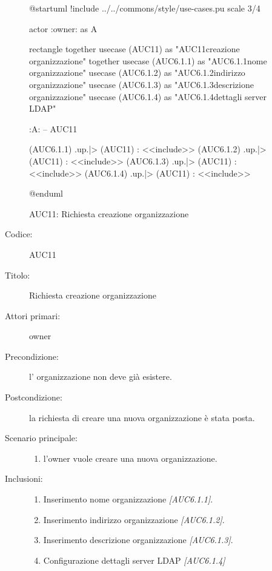 \documentclass[casi-duso]{subfiles}
\begin{document}
\begin{figure}[h!] 
  \centering 
  \begin{plantuml}
  @startuml
  !include ../../commons/style/use-cases.pu
  scale 3/4

  actor :owner: as A

  rectangle {
    together {
      usecase (AUC11) as "AUC11\nRichiesta creazione organizzazione"
    }
    together {
      usecase (AUC6.1.1) as "AUC6.1.1\nInserisci nome organizzazione"
      usecase (AUC6.1.2) as "AUC6.1.2\nInserisci indirizzo organizzazione"
      usecase (AUC6.1.3) as "AUC6.1.3\nInserisci descrizione organizzazione"
      usecase (AUC6.1.4) as "AUC6.1.4\nConfigurazione dettagli server LDAP"
    }
  }

  :A: -- AUC11

  (AUC6.1.1) .up.|> (AUC11) : <<include>>
  (AUC6.1.2) .up.|> (AUC11) : <<include>>
  (AUC6.1.3) .up.|> (AUC11) : <<include>>
  (AUC6.1.4) .up.|> (AUC11) : <<include>>

  @enduml
  \end{plantuml} 
  \caption{AUC11: Richiesta creazione organizzazione} 
  \label{fig:auc11} 
\end{figure}

\begin{description}
  \item[Codice:] AUC11
  \item[Titolo:] Richiesta creazione organizzazione
  \item[Attori primari:] owner
  \item[Precondizione:] l' organizzazione non deve già esistere.
  \item[Postcondizione:] la richiesta di creare una nuova organizzazione è stata posta.
  \item[Scenario principale:]
  \begin{enumerate}
    \item l'owner vuole creare una nuova organizzazione.
  \end{enumerate}
  \item[Inclusioni:]
  \begin{enumerate}
    \item Inserimento nome organizzazione \emph{[AUC6.1.1]}.
    \item Inserimento indirizzo organizzazione \emph{[AUC6.1.2]}.
    \item Inserimento descrizione organizzazione \emph{[AUC6.1.3]}.
    \item Configurazione dettagli server LDAP \emph{[AUC6.1.4]}
  \end{enumerate}
\end{description}
\end{document}
